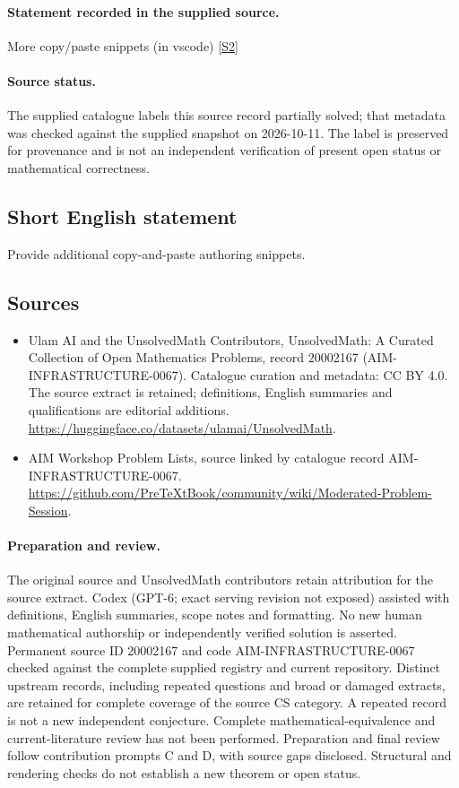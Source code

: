 \documentclass[11pt]{article}
\begin{document}
\paragraph{Statement recorded in the supplied source.}
More copy/paste snippets (in vscode) \href{https://github.com/PreTeXtBook/community/wiki/Moderated-Problem-Session}{[S2]}
\paragraph{Source status.}
The supplied catalogue labels this source record partially solved; that metadata was checked against the supplied snapshot on 2026-10-11. The label is preserved for provenance and is not an independent verification of present open status or mathematical correctness.
\subsection{Short English statement}
Provide additional copy-and-paste authoring snippets.
\subsection{Sources}
\begin{itemize}
\item[S1] Ulam AI and the UnsolvedMath Contributors, UnsolvedMath: A Curated Collection of Open Mathematics Problems, record 20002167 (AIM-INFRASTRUCTURE-0067). Catalogue curation and metadata: CC BY 4.0. The source extract is retained; definitions, English summaries and qualifications are editorial additions.
\url{https://huggingface.co/datasets/ulamai/UnsolvedMath}.
\item[S2] AIM Workshop Problem Lists, source linked by catalogue record AIM-INFRASTRUCTURE-0067.
\url{https://github.com/PreTeXtBook/community/wiki/Moderated-Problem-Session}.
\end{itemize}
\paragraph{Preparation and review.}
The original source and UnsolvedMath contributors retain attribution for the source extract. Codex (GPT-6; exact serving revision not exposed) assisted with definitions, English summaries, scope notes and formatting. No new human mathematical authorship or independently verified solution is asserted. Permanent source ID 20002167 and code AIM-INFRASTRUCTURE-0067 checked against the complete supplied registry and current repository. Distinct upstream records, including repeated questions and broad or damaged extracts, are retained for complete coverage of the source CS category. A repeated record is not a new independent conjecture. Complete mathematical-equivalence and current-literature review has not been performed. Preparation and final review follow contribution prompts C and D, with source gaps disclosed. Structural and rendering checks do not establish a new theorem or open status.
\label{end:20002167}
\end{document}
